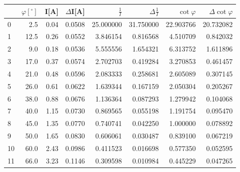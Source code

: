\begin{tabular}{lrrrrrrr}
\toprule
{} &  $\varphi[^\circ]$ &  I[A] &  $\Delta$I[A] &  $\frac{1}{I}$ &  $\Delta \frac{1}{I}$ &  $\cot{\varphi}$ &  $\Delta \cot{\varphi}$ \\
\midrule
0  &                2.5 &  0.04 &        0.0508 &      25.000000 &             31.750000 &        22.903766 &               20.732082 \\
1  &               12.5 &  0.26 &        0.0552 &       3.846154 &              0.816568 &         4.510709 &                0.842032 \\
2  &                9.0 &  0.18 &        0.0536 &       5.555556 &              1.654321 &         6.313752 &                1.611896 \\
3  &               17.0 &  0.37 &        0.0574 &       2.702703 &              0.419284 &         3.270853 &                0.461457 \\
4  &               21.0 &  0.48 &        0.0596 &       2.083333 &              0.258681 &         2.605089 &                0.307145 \\
5  &               26.0 &  0.61 &        0.0622 &       1.639344 &              0.167159 &         2.050304 &                0.205267 \\
6  &               38.0 &  0.88 &        0.0676 &       1.136364 &              0.087293 &         1.279942 &                0.104068 \\
7  &               40.0 &  1.15 &        0.0730 &       0.869565 &              0.055198 &         1.191754 &                0.095470 \\
8  &               45.0 &  1.35 &        0.0770 &       0.740741 &              0.042250 &         1.000000 &                0.078892 \\
9  &               50.0 &  1.65 &        0.0830 &       0.606061 &              0.030487 &         0.839100 &                0.067219 \\
10 &               60.0 &  2.43 &        0.0986 &       0.411523 &              0.016698 &         0.577350 &                0.052595 \\
11 &               66.0 &  3.23 &        0.1146 &       0.309598 &              0.010984 &         0.445229 &                0.047265 \\
\bottomrule
\end{tabular}
